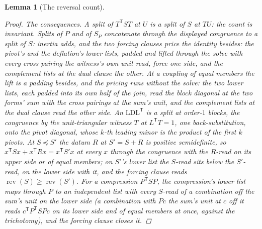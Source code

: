 \documentclass[11pt]{article}
\newtheorem{lemma}{Lemma}
\theoremstyle{definition}
\begin{document}
\begin{lemma}[The reversal count]
\begin{proof}
\emph{The consequences.} A split of $T^{\mathsf T}ST$ at $U$ is a
split of $S$ at $TU$: the count is invariant. Splits of $P$ and of
$S_P$ concatenate through the displayed congruence to a split of
$S$: inertia adds, and the two forcing clauses price the identity
besides: the pivot's and the deflation's lower lists, padded and
lifted through the solve with every cross pairing the witness's
own unit read, force one side, and the complement lists at the
dual clause the other. At a coupling of equal members the lift is
a padding besides, and the pricing runs without the solve: the two
lower lists, each padded into its own half of the join, read the
block diagonal at the two forms' sum with the cross pairings at
the sum's unit, and the complement lists at the dual clause read
the other side. An $\mathrm{LDL}^{\mathsf T}$ is a split at
order-$1$ blocks, the congruence by the unit-triangular witness $T$
at $L^{\mathsf T}T=1$, one back-substitution, onto the pivot
diagonal, whose $k$-th leading minor is the product of the first $k$
pivots. At $S\preceq S'$ the datum $R$ at $S'=S+R$ is positive
semidefinite, so $x^{\mathsf T}Sx+x^{\mathsf T}Rx=x^{\mathsf T}S'x$ at every
$x$ through the
congruence with the $R$-read on its upper side or of equal members;
on $S'$'s lower list the $S$-read sits below the $S'$-read, on the
lower side with it, and the
forcing clause reads
$\operatorname{rev}(S)\ge\operatorname{rev}(S')$. For a
compression $P^{\mathsf T}SP$, the compression's lower list
maps through $P$ to an independent list with every $S$-read of a
combination off the sum's unit on the lower side (a
combination with $Pc$ the sum's unit at $c$ off it reads
$c^{\mathsf T}P^{\mathsf T}SPc$ on its lower side and of equal members
at once, against the trichotomy), and the forcing clause closes it.
\end{proof}
\end{lemma}
\end{document}
